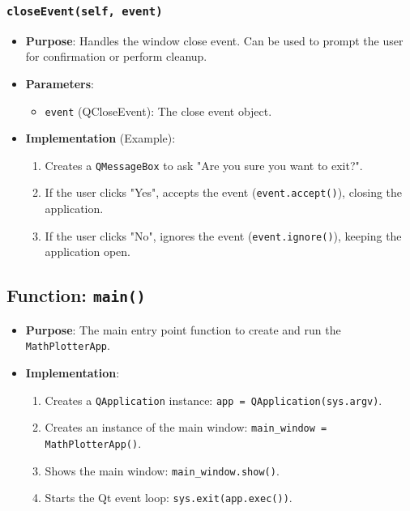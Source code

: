 \documentclass[12pt,a4paper]{report}
\begin{document}
\subsubsection{\texttt{closeEvent(self, event)}}
\begin{itemize}
    \item \textbf{Purpose}: Handles the window close event. Can be used to prompt the user for confirmation or perform cleanup.
    \item \textbf{Parameters}:
        \begin{itemize}
            \item \texttt{event} (QCloseEvent): The close event object.
        \end{itemize}
    \item \textbf{Implementation} (Example):
        \begin{enumerate}
            \item Creates a \texttt{QMessageBox} to ask "Are you sure you want to exit?".
            \item If the user clicks "Yes", accepts the event (\texttt{event.accept()}), closing the application.
            \item If the user clicks "No", ignores the event (\texttt{event.ignore()}), keeping the application open.
        \end{enumerate}
\end{itemize}

\subsection{Function: \texttt{main()}}
\begin{itemize}
    \item \textbf{Purpose}: The main entry point function to create and run the \texttt{MathPlotterApp}.
    \item \textbf{Implementation}:
        \begin{enumerate}
            \item Creates a \texttt{QApplication} instance: \texttt{app = QApplication(sys.argv)}.
            \item Creates an instance of the main window: \texttt{main\_window = MathPlotterApp()}.
            \item Shows the main window: \texttt{main\_window.show()}.
            \item Starts the Qt event loop: \texttt{sys.exit(app.exec())}.
        \end{enumerate}
\end{itemize}
\end{document}
